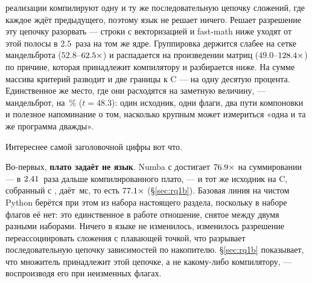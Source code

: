 реализации компилируют одну и ту же последовательную цепочку сложений, где каждое ждёт
предыдущего, поэтому язык не решает ничего. Решает разрешение эту цепочку разорвать --- строки с
векторизацией и fast-math ниже уходят от этой полосы в $2.5$~раза на том же ядре. Группировка
держится слабее на сетке мандельброта ($52.8$--$\meas{ratio:b1_compute-314:mandelbrot/cpython_loop|b1_compute-314:mandelbrot/cython}{62.5}\times$) и
распадается на произведении матриц ($49.0$--$\meas{ratio:b1_compute-314:matmul/cpython_loop|b1_compute-314:matmul/numba}{128.4}\times$) по причине, которая принадлежит
компилятору и разбирается ниже. На сумме массива критерий разводит и две границы к C --- на одну
десятую процента. Единственное же место, где они расходятся на заметную величину, ---
мандельброт, на \,\% ($t=48.3$): один исходник, одни флаги, два пути компоновки и
полезное напоминание о том, насколько крупным может измериться «одна и та же программа дважды».

Интереснее самой заголовочной цифры вот что.

Во-первых, \textbf{плато задаёт не язык}. Numba с  достигает $\meas{ratio:b1_compute-314:arraysum/cpython_loop|b1_compute-314:arraysum/numba_fastmath}{76.9}\times$ на
суммировании --- в $\meas{ratio:b1_compute-314:arraysum/numba|b1_compute-314:arraysum/numba_fastmath}{2.41}$~раза дальше компилированного плато, --- и тот же исходник на C, собранный
с , даёт \,мс, то есть $\meas{ratio:b1_compute-314:arraysum/cpython_loop|b1_flags-314:arraysum/O3native_ffast}{77.1}\times$ (\S\ref{sec:rq1b}). Базовая линия на чистом Python
берётся при этом из набора настоящего раздела, поскольку в наборе флагов её нет: это единственное
в работе отношение, снятое между двумя разными наборами. Ничего в языке не
изменилось, изменилось разрешение переассоциировать сложения с плавающей точкой, что разрывает
последовательную цепочку зависимостей по накопителю. \S\ref{sec:rq1b} показывает, что множитель
принадлежит этой цепочке, а не какому-либо компилятору, --- воспроизводя его при неизменных флагах.

